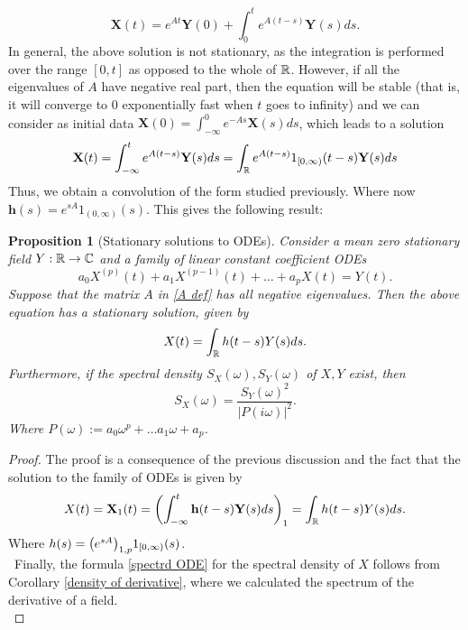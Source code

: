 \documentclass[12pt]{article}
\newtheorem{proposition}{Proposition}
\begin{document}
\begin{equation*}
	\mathbf{X}(t)=e^{A t}\mathbf{Y}(0)+\int_{0}^t e^{A(t-s)}\mathbf{Y}(s)ds.
\end{equation*}
In general, the above solution is not stationary, as the integration is performed over the range $[0,t]$ as opposed to the whole of  ${\mathbb R}$. However, if all the eigenvalues of $A$ have negative real part, then the equation will be stable (that is, it will converge to $0$ exponentially fast when  $t$ goes to infinity) and we can consider as initial data $\mathbf{X}(0)=\int_{-\infty}^0 e^{-As}\mathbf{X}(s)ds$, which leads to a solution
\begin{equation*}
	\mathbf{X}(t)=\int_{-\infty}^t e^{A(t-s)}\mathbf{Y}(s)ds=\int_{\mathbb R} e^{A(t-s)}1_{[0,\infty)}(t-s)\mathbf{Y}(s)ds
\end{equation*}
Thus, we obtain a convolution of the form studied previously. Where now $\mathbf{h}(s)=e^{sA}1_{(0,\infty)}(s)$. This gives the following result:
\begin{proposition}[Stationary solutions to ODEs]
	Consider a mean zero stationary field $Y:{\mathbb R}\to\mathbb{C}$ and a family of linear constant coefficient ODEs
	\begin{equation*}
		a_0X^{(p)}(t)+a_1X^{(p-1)}(t)+\ldots+a_pX(t)=Y(t).
	\end{equation*}
	Suppose that the matrix $A$ in \eqref{A def}  has all negative eigenvalues. Then the above equation has a stationary solution, given by
	\begin{equation*}
		X(t)=\int_{\mathbb R} h(t-s){Y}(s)ds.
	\end{equation*}
	Furthermore, if the spectral density $S_X(\omega),S_Y(\omega)$ of $X,Y$ exist, then
	\begin{equation}\label{spectrd ODE}
		S_X(\omega)=\frac{S_Y(\omega)^2}{|P(i\omega)|^2}.
	\end{equation}
	Where $P(\omega):=a_0\omega^p+\ldots a_{1}\omega+a_p$.
\end{proposition}
\begin{proof}
	The proof is a consequence of the previous discussion and the fact that the solution to the family of ODEs is given by
	\begin{equation*}
		X(t)=\mathbf{X}_1(t)=\qty(\int_{-\infty}^t \mathbf{h}(t-s)\mathbf{Y}(s)ds)_1=\int_{\mathbb R} h(t-s)Y(s)ds.
	\end{equation*}
	Where $h(s)=\qty(e^{sA})_{1,p}1_{[0,\infty)}(s)$.\\
	\
	Finally, the formula \eqref{spectrd ODE} for the spectral density of $X$ follows from Corollary \ref{density of derivative}, where we calculated the spectrum of the derivative of a field.\\
\end{proof}
\end{document}
